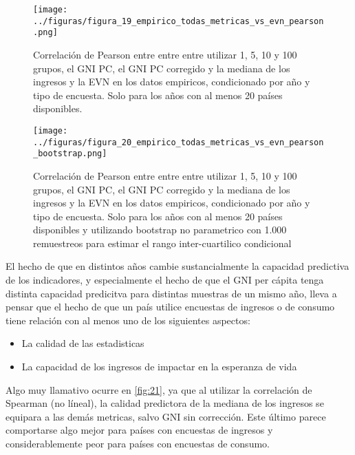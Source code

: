 \begin{figure}[H] %
    \centering %
    \texttt{[image: ../figuras/figura\_19\_empirico\_todas\_metricas\_vs\_evn\_pearson.png]} %
    \caption{Correlación de Pearson entre entre entre utilizar 1, 5, 10 y 100 grupos, el GNI PC, el GNI PC corregido y la mediana de los ingresos y la EVN en los datos empiricos, condicionado por año y tipo de encuesta. Solo para los años con al menos 20 países disponibles.}
    \label{fig:19} %
\end{figure}

\begin{figure}[H] %
    \centering %
    \texttt{[image: ../figuras/figura\_20\_empirico\_todas\_metricas\_vs\_evn\_pearson\_bootstrap.png]} %
    \caption{Correlación de Pearson entre entre entre utilizar 1, 5, 10 y 100 grupos, el GNI PC, el GNI PC corregido y la mediana de los ingresos y la EVN en los datos empiricos, condicionado por año y tipo de encuesta. Solo para los años con al menos 20 países disponibles y utilizando bootstrap no parametrico con 1.000 remuestreos para estimar el rango inter-cuartilico condicional}
    \label{fig:20} %
\end{figure}


El hecho de que en distintos años cambie sustancialmente la capacidad predictiva de los indicadores, y especialmente el hecho de que el GNI per cápita tenga distinta capacidad predicitva para distintas muestras de un mismo año, lleva a pensar que el hecho de que un país utilice encuestas de ingresos o de consumo tiene relación con al menos uno de los siguientes aspectos:
\begin{itemize}
    \item La calidad de las estadisticas
    \item La capacidad de los ingresos de impactar en la esperanza de vida
\end{itemize}


Algo muy llamativo ocurre en \ref{fig:21}, ya que al utilizar la correlación de Spearman (no líneal), la calidad predictora de la mediana de los ingresos se equipara a las demás metricas, salvo GNI sin corrección. Este último parece comportarse algo mejor para países con encuestas de ingresos y considerablemente peor para países con encuestas de consumo.

